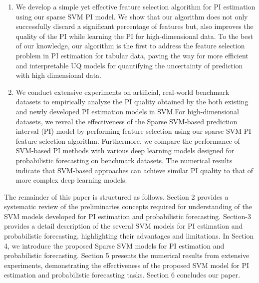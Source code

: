\documentclass[10pt]{article} %
\begin{document}
\begin{enumerate}
    \item [(c)] We develop a simple yet effective feature selection algorithm for PI estimation using our sparse SVM PI model. We show that our algorithm does not only successfully discard a significant percentage of features but, also improves the quality of the PI  while learning the PI for high-dimensional data. To the best of our knowledge, our algorithm is the first to address the  feature selection problem in PI estimation for tabular data, paving the way for more efficient and interpretable UQ models for quantifying the uncertainty of prediction with high dimensional data.   
    
    \item[(d)] We conduct extensive experiments on artificial, real-world benchmark datasets to empirically analyze the PI quality obtained by the both existing and newly developed PI estimation models in SVM.For high-dimensional datasets, we reveal the effectiveness of the Sparse SVM-based prediction interval (PI) model by performing feature selection using  our sparse SVM PI feature selection algorithm. Furthermore, we compare the performance of SVM-based PI methods with various deep learning models designed for probabilistic forecasting on benchmark datasets. The numerical results indicate that SVM-based approaches can achieve  similar PI quality to that of more complex deep learning models. 
    
\end{enumerate}

 
The remainder of this paper is structured as follows. Section 2 provides a systematic review of the preliminaries concepts required for understanding of the SVM models developed for PI estimation and probabilistic forecasting.  Section-3 provides a detail description of the several SVM models for PI estimation and probabilistic forecasting,   highlighting their advantages and limitations. In Section 4, we introduce the proposed Sparse SVM models for PI estimation and probabilistic forecasting. Section 5 presents the numerical results from extensive experiments, demonstrating the effectiveness of the proposed SVM model for PI estimation and probabilistic forecasting tasks. Section 6 concludes our paper. 
\end{document}

